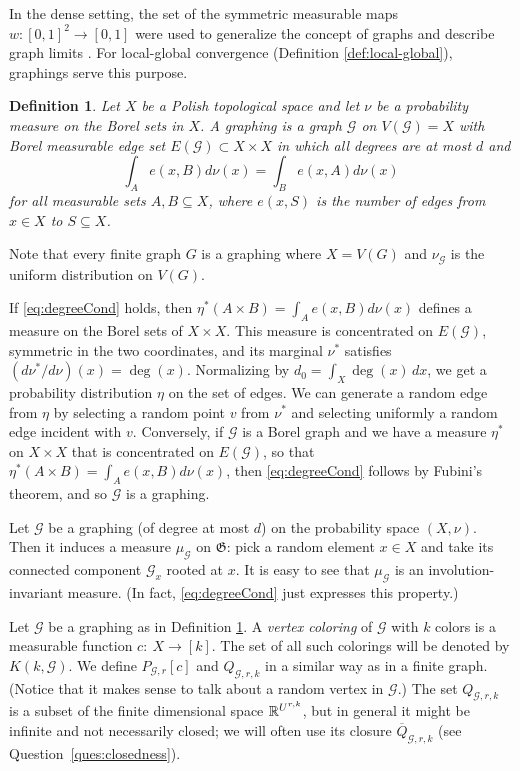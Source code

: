 \documentclass{article}
\newtheorem{definition}[theorem]{Definition}
\def\GG{\mathcal{G}}\def\HH{\mathcal{H}}\def\II{\mathcal{I}}
\def\Gf{\mathfrak{G}}\def\Hf{\mathfrak{H}}\def\If{\mathfrak{I}}
\begin{document}
In the dense setting, the set of the symmetric measurable maps
$w:[0,1]^2 \rightarrow [0,1]$ were used to generalize the concept of
graphs and describe graph limits \cite{LSz}. For local-global
convergence {(Definition \ref{def:local-global})}, graphings serve
this purpose.

\begin{definition}\label{defgraphing}
Let $X$ be a Polish topological space and let $\nu$ be a probability
measure on the Borel sets in $X$. A {\em graphing} is a graph $\GG$
on $V(\GG)=X$ with Borel measurable edge set $E(\GG)\subset X\times
X$ in which all degrees are at most $d$ and
\begin{equation}
\label{eq:degreeCond} \int_A e(x,B) d\nu(x) = \int_B e(x,A) d\nu(x)
\end{equation}
for all measurable sets $A,B\subseteq X$, where $e(x,S)$ is the
number of edges from $x\in X$ to $S\subseteq X$.
\end{definition}


Note that every finite graph $G$ is a graphing where $X=V(G)$ and
$\nu_\GG$ is the uniform distribution on $V(G)$.

If  \eqref{eq:degreeCond} holds, then $\eta^*(A\times B)=\int_A
e(x,B) d\nu(x)$ defines a measure on the Borel sets of $X\times X$.
This measure is concentrated on $E(\GG)$, symmetric in the two
coordinates, and its marginal $\nu^*$ satisfies $(d\nu^*/d\nu)(x)
=\deg(x)$. Normalizing by $d_0=\int_X \deg(x)\,dx$, we get a
probability distribution $\eta$ on the set of edges. We can generate
a random edge from $\eta$ by selecting a random point $v$ from
$\nu^*$ and selecting uniformly a random edge incident with $v$.
Conversely, if $\GG$ is a Borel graph and we have a measure $\eta^*$
on $X\times X$ that is concentrated on $E(\GG)$, so that
$\eta^*(A\times B)=\int_A e(x,B) d\nu(x)$, then \eqref{eq:degreeCond}
follows by Fubini's theorem, and so $\GG$ is a graphing.

Let $\GG$ be a graphing (of degree at most $d$) on the probability
space $(X,\nu)$. Then it induces a measure $\mu_{\GG}$ on $\Gf$: pick
a random element $x\in X$ and take its connected component $\GG_x$
rooted at $x$. It is easy to see that $\mu_{\GG}$ is an
involution-invariant measure. (In fact, \eqref{eq:degreeCond} just
expresses this property.)

Let $\GG$ be a graphing as in Definition \ref{defgraphing}. A {\em
vertex coloring} of $\GG$ with $k$ colors is a measurable function
$c:~X\rightarrow [k]$. The set of all such colorings  will be denoted
by $K(k,\GG)$. We define $P_{\GG,r}[c]$ and $Q_{\GG,r,k}$ in a
similar way as in a finite graph. (Notice that it makes sense to talk
about a random vertex in $\GG$.) The set $Q_{\GG,r,k}$ is a subset of
the finite dimensional space $\mathbb{R}^{U^{r,k}}$, but in general it
might be infinite and not necessarily closed; we will often use its
closure $\overline{Q}_{\GG,r,k}$ (see
Question~\ref{ques:closedness}).
\end{document}
